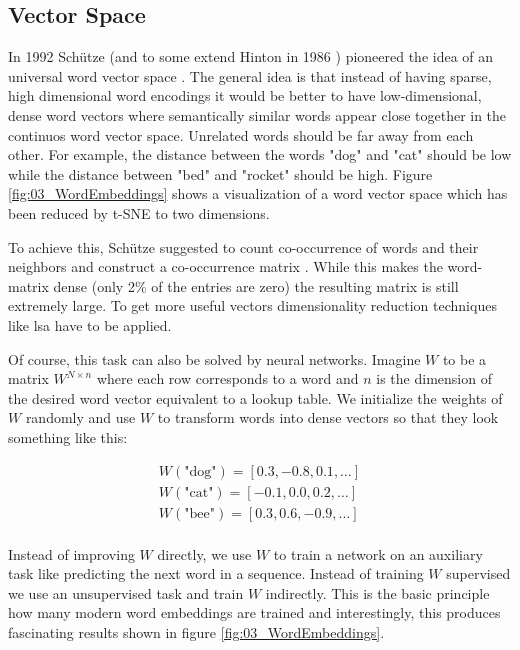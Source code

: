 \subsection{Vector Space}
\label{sec:03_vectorSpace}

In 1992 Schütze {(and to some extend Hinton in 1986 \cite{Hinton1986})} pioneered the idea of an universal word vector space \cite{Schutze1992}. The general idea is that instead of having sparse, high dimensional word encodings it would be better to have low-dimensional, dense word vectors where semantically similar words appear close together in the continuos word vector space. Unrelated words should be far away from each other. For example, the distance between the words "dog" and "cat" should be low while the distance between "bed" and "rocket" should be high. Figure \ref{fig:03_WordEmbeddings} shows a visualization of a word vector space which has been reduced by t-SNE to two dimensions.
\medskip

To achieve this, Schütze suggested to count co-occurrence of words and their neighbors and construct a co-occurrence matrix \cite{Schutze1992}. While this makes the word-matrix dense {(only 2\% of the entries are zero)} the resulting matrix is still extremely large. To get more useful vectors dimensionality reduction techniques like \gls{lsa} have to be applied.
\medskip

Of course, this task can also be solved by neural networks. Imagine $W$ to be a matrix $W^{N\times n}$ where each row corresponds to a word and $n$ is the dimension of the desired word vector equivalent to a lookup table. We initialize the weights of $W$ randomly and use $W$ to transform words into dense vectors so that they look something like this:

\begin{equation*}
	\begin{aligned}
		W(\text{"dog"}) = [0.3, -0.8, 0.1, \dots] \\
		W(\text{"cat"}) = [-0.1, 0.0, 0.2, \dots] \\
		W(\text{"bee"}) = [0.3, 0.6, -0.9, \dots] \\
	\end{aligned}
\end{equation*}

Instead of improving $W$ directly, we use $W$ to train a network on an auxiliary task like predicting the next word in a sequence. Instead of training $W$ supervised we use an unsupervised task and train $W$ indirectly. This is the basic principle how many modern word embeddings are trained and interestingly, this produces fascinating results shown in figure \ref{fig:03_WordEmbeddings}.
\medskip

